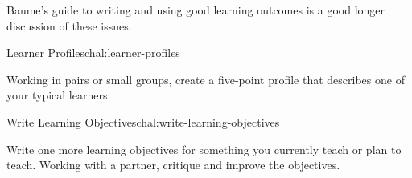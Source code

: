 Baume's guide to writing and using good learning outcomes
\cite{bib:baume-fixme} is a good longer discussion of these issues.

\begin{challenge}{Learner Profiles}{chal:learner-profiles}

Working in pairs or small groups, create a five-point profile that
describes one of your typical learners.

\end{challenge}

\begin{challenge}{Write Learning Objectives}{chal:write-learning-objectives}

Write one more learning objectives for something you currently teach
or plan to teach.  Working with a partner, critique and improve the
objectives.

\end{challenge}
